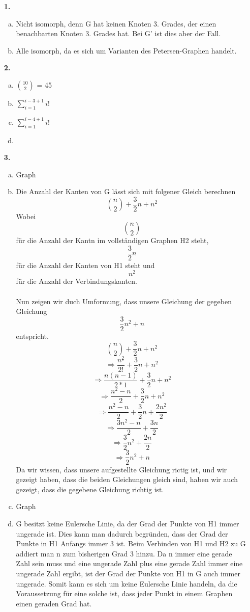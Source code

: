 \documentclass[a4paper]{scrartcl}
\title{\titleinfo}
\author{Elena Noll, Sven-Hendrik Haase, Arne Feil}
\date{\today}
\begin{document}
\maketitle

\begin{enumerate}
\item[\textbf{1.}]
\begin{enumerate}[a)]
\item Nicht isomorph, denn G hat keinen Knoten 3. Grades, der einen benachbarten Knoten 3. Grades hat. Bei G' ist dies aber der Fall.
\item Alle isomorph, da es sich um Varianten des Petersen-Graphen handelt.
\end{enumerate}
\item[\textbf{2.}]
\begin{enumerate}[a)]
\item \({10 \choose 2}\) = 45
\item \(\sum\limits_{i=1}^{i-3+1}i!\)
\item \(\sum\limits_{i=1}^{i-4+1}i!\)
\item 
\end{enumerate}
\item[\textbf{3.}]
\begin{enumerate}[a)]
\item Graph
\item Die Anzahl der Kanten von G lässt sich mit folgener Gleich berechnen \\
\[\binom{n}{2}+\frac{3}{2}n+n^2\]
Wobei \[\binom{n}{2}\] für die Anzahl der Kantn im vollständigen Graphen H2 steht,
\[\frac{3}{2}n\] für die Anzahl der Kanten von H1 steht und \[n^2\] für die Anzahl
der Verbindungskanten. \\
\\
Nun zeigen wir duch Umformung, dass unsere Gleichung der gegeben Gleichung
\[\frac{3}{2}n^2+n\] entspricht.
\[\binom{n}{2}+\frac{3}{2}n+n^2\]
\[\Rightarrow \frac{n^{\underline{2}}}{2!}+\frac{3}{2}n+n^2\]
\[\Rightarrow \frac{n(n-1)}{2 * 1} + \frac{3}{2}n + n^2\]
\[\Rightarrow \frac{n^2 - n}{2} + \frac{3}{2}n + n^2\]
\[\Rightarrow \frac{n^2 - n}{2} + \frac{3}{2}n + \frac{2n^2}{2}\]
\[\Rightarrow \frac{3n^2 - n}{2} + \frac{3n}{2}\]
\[\Rightarrow \frac{3}{2}n^2 + \frac{2n}{2}\]
\[\Rightarrow \frac{3}{2}n^2 + n\]
Da wir wissen, dass unsere aufgestellte Gleichung rictig ist, und wir gezeigt haben,
dass die beiden Gleichungen gleich sind, haben wir auch gezeigt, dass die gegebene 
Gleichung richtig ist.
\item Graph
\item G besitzt keine Eulersche Linie, da der Grad der Punkte von H1 immer ungerade ist.
Dies kann man dadurch begründen, dass der Grad der Punkte in H1 Anfangs immer 3 ist. 
Beim Verbinden von H1 und H2 zu G addiert man n zum bisherigen Grad 3 hinzu.
Da n immer eine gerade Zahl sein muss und eine ungerade Zahl plus eine gerade Zahl
immer eine ungerade Zahl ergibt, ist der Grad der Punkte von H1 in G auch immer ungerade.
Somit kann es sich um keine Eulersche Linie handeln, da die Voraussetzung für eine solche ist, dass jeder Punkt in einem Graphen einen geraden Grad hat.


\end{enumerate}
\end{enumerate}
\end{document}
